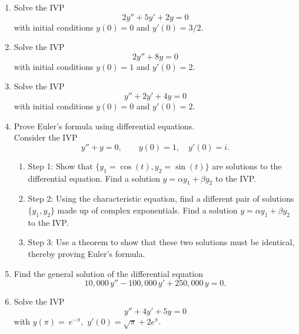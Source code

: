 \documentclass[12pt]{book}
\begin{document}
\begin{enumerate}

\item
  Solve the IVP
  \begin{dmath*}
    2 y'' + 5y' + 2y =0
  \end{dmath*}
  with initial conditions $y(0)=0$ and $y'(0)=3/2$.

\item
  Solve the IVP
  \begin{dmath*}
    2 y'' + 8y =0
  \end{dmath*}
  with initial conditions $y(0)=1$ and $y'(0)=2$.

\item
  Solve the IVP
  \begin{dmath*}
    y'' + 2y' + 4y=0
  \end{dmath*}
  with initial conditions $y(0)=0$ and $y'(0)=2$.

\item
  Prove Euler's formula using differential equations. \\
  Consider the IVP
  \begin{dmath*}[compact]
    y'' +y =0, \qquad y(0)=1, \quad y'(0)=i.
  \end{dmath*}
  \begin{enumerate}
    \item Step 1: Show that $\{y_1=\cos(t),y_2=\sin(t)\}$ are solutions
      to the differential equation. Find a solution $y=\alpha y_1 + \beta y_2$
      to the IVP.
    \item Step 2: Using the characteristic equation, find a different pair
      of solutions $\{y_1,y_2\}$ made up of complex exponentials. Find a
      solution $y=\alpha y_1 + \beta y_2$ to the IVP.
    \item Step 3: Use a theorem to show that these two solutions must be
      identical, thereby proving Euler's formula.
  \end{enumerate}

\item
  Find the general solution of the differential equation
  \begin{dmath*}
  10, \! 000 \, y'' - 100, \! 000 \, y' + 250, \! 000 \, y = 0.
  \end{dmath*}


\item
  Solve the IVP
  \begin{dmath*}
    y'' + 4y' + 5y = 0
  \end{dmath*}
  with $y(\pi) =\ e^{-\pi},$ $y' (0) = \sqrt{\pi} + 2e^\pi$.

\end{enumerate}
\end{document}
